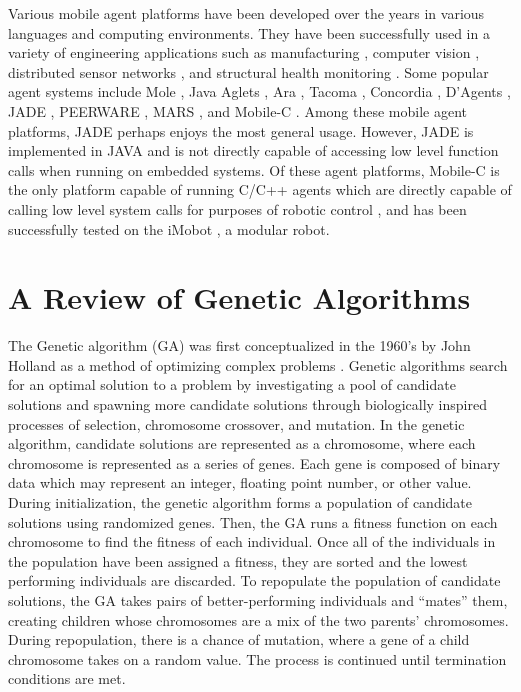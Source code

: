     Various mobile agent platforms have been developed over the years in
    various languages and computing environments. 
    They have been successfully used in a variety of engineering applications
    such as manufacturing \cite{DiStefano2008, Nestinger2010}, computer vision
    \cite{Nestinger2010b}, distributed sensor networks \cite{Fok2005, Wu2001},
      and structural health monitoring \cite{Taylor2009}. Some popular agent
      systems include Mole \cite{Baumann2002}, Java Aglets \cite{Lange1998},
      Ara \cite{Peine2002}, Tacoma \cite{Johnansen2002}, Concordia
      \cite{Wong1997}, D’Agents \cite{Gray2002}, JADE \cite{Bellifemine2008},
      PEERWARE \cite{Cugola2001}, MARS \cite{Cabri2000}, and
      Mobile-C \cite{Chen2006, Chou2010, mobilec}. 
    Among these mobile agent platforms, JADE perhaps enjoys the most general
      usage. 
    However, JADE is implemented in JAVA and is not directly capable of
      accessing low level function calls when running on embedded systems. 
    Of these agent platforms, Mobile-C is the only platform capable of running
    C/C++ agents which are directly capable of calling low level system calls
      for purposes of robotic control \cite{Nestinger2010}, and has been
      successfully tested on the iMobot \cite{Ryland2010, Ko2010}, a modular
      robot.


  \section{A Review of Genetic Algorithms} %
    The Genetic algorithm (GA) was first conceptualized in the 1960’s by John Holland as a
      method of optimizing complex problems \cite{Goldberg1988}. 
    Genetic algorithms search for an optimal solution to a problem by
      investigating a pool of candidate solutions and spawning more candidate
      solutions through biologically inspired processes of selection,
      chromosome crossover, and mutation. 
    In the genetic algorithm, candidate solutions are represented as a 
      chromosome, where each chromosome is represented as a series of
      genes.
    Each gene is composed of binary data which may represent an integer, 
      floating point number, or other value.
    During initialization, the genetic algorithm forms a population of 
      candidate solutions using randomized genes. 
    Then, the GA runs a fitness function on each chromosome to find the fitness
      of each individual. 
    Once all of the individuals in the population have been assigned a fitness, 
      they are sorted and the lowest performing individuals are discarded.
    To repopulate the population of candidate solutions, the GA takes
      pairs of better-performing individuals and ``mates'' them, creating
      children whose chromosomes are a mix of the two parents' chromosomes.
    During repopulation, there is a chance of mutation, where a gene of
      a child chromosome takes on a random value. 
    The process is continued until termination conditions are met.


